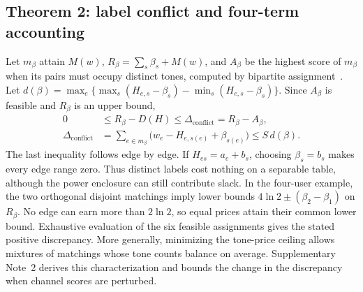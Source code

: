 \documentclass[11pt,letterpaper]{article}
\newcommand{\dc}{\Delta_{\mathrm{conflict}}}
\begin{document}
\subsection*{Theorem 2: label conflict and four-term accounting}
Let \(m_\beta\) attain \(M(w)\), \(R_\beta=\sum_s\beta_s+M(w)\), and \(A_\beta\) be the highest score of \(m_\beta\) when its pairs must occupy distinct tones, computed by bipartite assignment~\cite{kuhn}. Let \(d(\beta)=\max_e\{\max_s(H_{e,s}-\beta_s)-\min_s(H_{e,s}-\beta_s)\}\). Since \(A_\beta\) is feasible and \(R_\beta\) is an upper bound,
\begin{equation}
\begin{aligned}
0 &\le R_\beta-D(H)\le\dc=R_\beta-A_\beta,\\
\dc &=\sum_{e\in m_\beta}\bigl(w_e-H_{e,s(e)}+\beta_{s(e)}\bigr)
       \le S\,d(\beta).
\end{aligned}
\label{eq:conflict}
\end{equation}
The last inequality follows edge by edge. If \(H_{es}=a_e+b_s\), choosing \(\beta_s=b_s\) makes every edge range zero. Thus distinct labels cost nothing on a separable table, although the power enclosure can still contribute slack. In the four-user example, the two orthogonal disjoint matchings imply lower bounds \(4\ln2\pm(\beta_2-\beta_1)\) on \(R_\beta\). No edge can earn more than \(2\ln2\), so equal prices attain their common lower bound. Exhaustive evaluation of the six feasible assignments gives the stated positive discrepancy. More generally, minimizing the tone-price ceiling allows mixtures of matchings whose tone counts balance on average. Supplementary Note~2 derives this characterization and bounds the change in the discrepancy when channel scores are perturbed.
\end{document}
